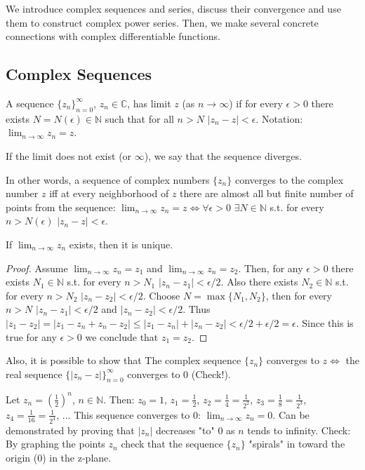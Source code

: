 \documentclass[12pt]{article}
\begin{document}
We introduce complex sequences and series, discuss their convergence and use them to construct complex power series. Then, we make several concrete connections with complex differentiable functions.

\subsection{Complex Sequences}

\begin{definition}
A sequence $\{z_n\}_{n=0}^\infty$, $z_n \in \mathbb{C}$, has limit $z$ (as $n \to \infty$) if for every $\epsilon > 0$ there exists $N = N(\epsilon) \in \mathbb{N}$ such that for all $n > N$ $|z_n - z| < \epsilon$. Notation: $\lim_{n\to\infty} z_n = z$.
\end{definition}

If the limit does not exist (or $\infty$), we say that the sequence diverges.

In other words, a sequence of complex numbers $\{z_n\}$ converges to the complex number $z$ iff at every neighborhood of $z$ there are almost all but finite number of points from the sequence:
$\lim_{n\to\infty} z_n = z \iff \forall \epsilon > 0$ $\exists N \in \mathbb{N}$ s.t. for every $n > N(\epsilon)$ $|z_n - z| < \epsilon$.

\begin{lemma}
If $\lim_{n\to\infty} z_n$ exists, then it is unique.
\end{lemma}

\begin{proof}
Assume $\lim_{n\to\infty} z_n = z_1$ and $\lim_{n\to\infty} z_n = z_2$. Then, for any $\epsilon > 0$ there exists $N_1 \in \mathbb{N}$ s.t. for every $n > N_1$ $|z_n - z_1| < \epsilon/2$.
Also there exists $N_2 \in \mathbb{N}$ s.t. for every $n > N_2$ $|z_n - z_2| < \epsilon/2$.
Choose $N = \max\{N_1, N_2\}$, then for every $n > N$ $|z_n - z_1| < \epsilon/2$ and $|z_n - z_2| < \epsilon/2$.
Thus $|z_1 - z_2| = |z_1 - z_n + z_n - z_2| \leq |z_1 - z_n| + |z_n - z_2| < \epsilon/2 + \epsilon/2 = \epsilon$.
Since this is true for any $\epsilon > 0$ we conclude that $z_1 = z_2$.
\end{proof}

Also, it is possible to show that
The complex sequence $\{z_n\}$ converges to $z \iff$ the real sequence $\{|z_n - z|\}_{n=0}^\infty$ converges to 0 (Check!).

\begin{example}
Let $z_n = (\frac{1}{2})^n$, $n \in \mathbb{N}$. Then:
$z_0 = 1$, $z_1 = \frac{1}{2}$, $z_2 = \frac{1}{4} = \frac{1}{2^2}$, $z_3 = \frac{1}{8} = \frac{1}{2^3}$, $z_4 = \frac{1}{16} = \frac{1}{2^4}$, ...
This sequence converges to 0: $\lim_{n\to\infty} z_n = 0$. Can be demonstrated by proving that $|z_n|$ decreases "to" 0 as $n$ tends to infinity.
Check: By graphing the points $z_n$ check that the sequence $\{z_n\}$ "spirals" in toward the origin (0) in the z-plane.
\end{example}
\end{document}
